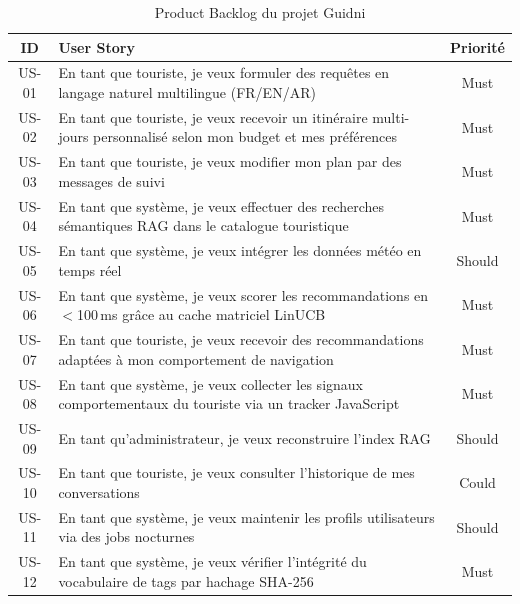 \begin{table}[H]
    \centering
    \caption{Product Backlog du projet Guidni}
    \label{tab:product_backlog}
    \small
    \begin{tabular}{c p{9cm} c}
        \toprule
        \textbf{ID} & \textbf{User Story} & \textbf{Priorité} \\
        \midrule
        US-01 & En tant que touriste, je veux formuler des requêtes en langage naturel
        multilingue (FR/EN/AR) & Must \\[3pt]
        US-02 & En tant que touriste, je veux recevoir un itinéraire multi-jours personnalisé
        selon mon budget et mes préférences & Must \\[3pt]
        US-03 & En tant que touriste, je veux modifier mon plan par des messages de suivi & Must \\[3pt]
        US-04 & En tant que système, je veux effectuer des recherches sémantiques RAG dans le
        catalogue touristique & Must \\[3pt]
        US-05 & En tant que système, je veux intégrer les données météo en temps réel & Should \\[3pt]
        US-06 & En tant que système, je veux scorer les recommandations en $<$100\,ms grâce
        au cache matriciel LinUCB & Must \\[3pt]
        US-07 & En tant que touriste, je veux recevoir des recommandations adaptées à mon
        comportement de navigation & Must \\[3pt]
        US-08 & En tant que système, je veux collecter les signaux comportementaux du touriste
        via un tracker JavaScript & Must \\[3pt]
        US-09 & En tant qu'administrateur, je veux reconstruire l'index RAG & Should \\[3pt]
        US-10 & En tant que touriste, je veux consulter l'historique de mes conversations & Could \\[3pt]
        US-11 & En tant que système, je veux maintenir les profils utilisateurs via des jobs
        nocturnes & Should \\[3pt]
        US-12 & En tant que système, je veux vérifier l'intégrité du vocabulaire de tags par
        hachage SHA-256 & Must \\
        \bottomrule
    \end{tabular}
\end{table}


